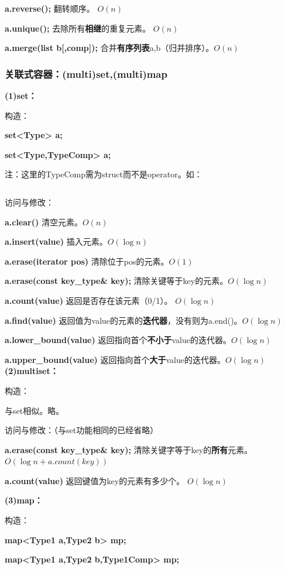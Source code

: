 \documentclass[a4paper,11pt]{article}
\begin{document}
\textbf{a.reverse();} 翻转顺序。 \(O(n)\)

\textbf{a.unique();} 去除所有\textbf{相继}的重复元素。 \(O(n)\)

\textbf{a.merge(list b{[},comp{]});}
合并\textbf{有序列表}a,b（归并排序）。\(O(n)\)

\subsubsection{关联式容器：(multi)set,(multi)map}
\textbf{(1)set：}

构造：

\textbf{set\textless{}Type\textgreater{} a;}

\textbf{set\textless{}Type,TypeComp\textgreater{} a; }

注：这里的TypeComp需为struct而不是operator。如：
\inputminted[linenos]{c++}{basic/typecomp.cpp}


访问与修改：

\textbf{a.clear()} 清空元素。\(O(n)\)

\textbf{a.insert(value)} 插入元素。\(O(\log n)\)

\textbf{a.erase(iterator pos)} 清除位于pos的元素。\(O(1)\)

\textbf{a.erase(const key\_type\& key);}
清除关键等于key的元素。\(O(\log n)\)

\textbf{a.count(value)} 返回是否存在该元素（0/1）。 \(O(\log n)\)

\textbf{a.find(value)}
返回值为value的元素的\textbf{迭代器}，没有则为a.end()。\(O(\log n)\)

\textbf{a.lower\_bound(value)}
返回指向首个\textbf{不小于}value的迭代器。\(O(\log n)\)

\textbf{a.upper\_bound(value)}
返回指向首个\textbf{大于}value的迭代器。\(O(\log n)\)
\noindent\textbf{(2)multiset：}

构造：

与set相似。略。

访问与修改：（与set功能相同的已经省略）

\textbf{a.erase(const key\_type\& key);}
清除关键字等于key的\textbf{所有}元素。\(O(\log n+a.count(key))\)

\textbf{a.count(value)} 返回键值为key的元素有多少个。 \(O(\log n)\)

\noindent\textbf{(3)map：}

构造：

\textbf{map\textless{}Type1 a,Type2 b\textgreater{} mp;}

\textbf{map\textless{}Type1 a,Type2 b,Type1Comp\textgreater{} mp;}
\end{document}
